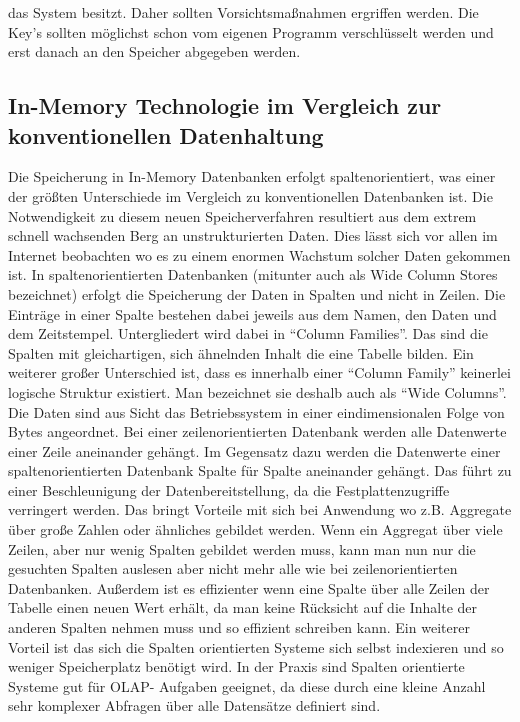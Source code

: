 \documentclass[a4paper, 12pt]{scrartcl}
\begin{document}
das System besitzt. Daher sollten Vorsichtsmaßnahmen ergriffen werden. Die Key’s sollten möglichst schon vom eigenen Programm verschlüsselt werden und erst danach an den Speicher abgegeben werden.



\newpage 
\subsection{In-Memory Technologie im Vergleich zur konventionellen Datenhaltung}
Die Speicherung in In-Memory Datenbanken erfolgt spaltenorientiert, was einer der größten Unterschiede im Vergleich zu konventionellen Datenbanken ist. Die Notwendigkeit zu diesem neuen Speicherverfahren resultiert aus dem extrem schnell wachsenden Berg an unstrukturierten Daten. Dies lässt sich vor allen im Internet beobachten wo es zu einem enormen Wachstum solcher Daten gekommen ist. 
In spaltenorientierten Datenbanken (mitunter auch als Wide Column Stores bezeichnet) erfolgt die Speicherung der Daten in Spalten und nicht in Zeilen. Die Einträge in einer Spalte bestehen dabei jeweils aus dem Namen, den Daten und dem Zeitstempel. Untergliedert wird dabei in "`Column Families"'. Das sind die Spalten mit gleichartigen, sich ähnelnden Inhalt die eine Tabelle bilden. 
Ein weiterer großer Unterschied ist, dass es innerhalb einer "`Column Family"' keinerlei logische Struktur existiert. Man bezeichnet sie deshalb auch als "`Wide Columns"'.  
Die Daten sind aus Sicht das Betriebssystem in einer eindimensionalen Folge von Bytes angeordnet. Bei einer zeilenorientierten Datenbank werden alle Datenwerte einer Zeile aneinander gehängt. Im Gegensatz dazu werden die Datenwerte einer spaltenorientierten Datenbank Spalte für Spalte aneinander gehängt.
Das führt zu einer Beschleunigung der Datenbereitstellung, da die Festplattenzugriffe verringert werden.
Das bringt Vorteile mit sich bei Anwendung wo z.B. Aggregate über große Zahlen oder ähnliches gebildet werden. Wenn ein Aggregat über viele Zeilen, aber nur wenig Spalten gebildet werden muss, kann man nun nur die gesuchten Spalten auslesen aber nicht mehr alle wie bei zeilenorientierten Datenbanken. Außerdem ist es effizienter wenn eine Spalte über alle Zeilen der Tabelle einen neuen Wert erhält, da man keine Rücksicht auf die Inhalte der anderen Spalten nehmen muss und so effizient schreiben kann.
Ein weiterer Vorteil ist das sich die Spalten orientierten Systeme sich selbst indexieren und so weniger Speicherplatz benötigt wird.
In der Praxis sind Spalten orientierte Systeme gut für OLAP- Aufgaben geeignet, da diese durch eine kleine Anzahl sehr komplexer Abfragen über alle Datensätze definiert sind.
\end{document}
